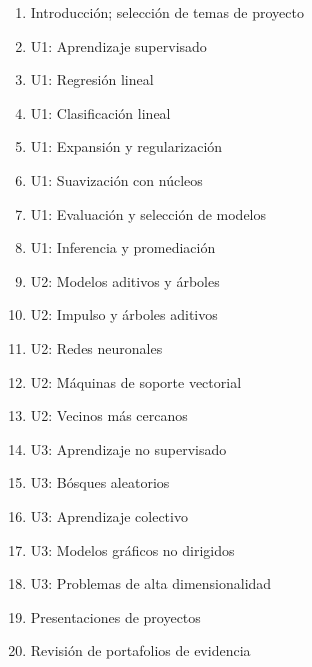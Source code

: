 \begin{enumerate}[itemsep=-3pt]
\item{Introducci\'{o}n; selecci\'{o}n de temas de proyecto}
\item{U1: Aprendizaje supervisado}
\item{U1: Regresi\'{o}n lineal}
\item{U1: Clasificaci\'{o}n lineal}
\item{U1: Expansi\'{o}n y regularizaci\'{o}n}
\item{U1: Suavizaci\'{o}n con n\'{u}cleos}
\item{U1: Evaluaci\'{o}n y selecci\'{o}n de modelos}
\item{U1: Inferencia y promediaci\'{o}n}
\item{U2: Modelos aditivos y \'{a}rboles}
\item{U2: Impulso y \'{a}rboles aditivos}
\item{U2: Redes neuronales}
\item{U2: M\'{a}quinas de soporte vectorial}
\item{U2: Vecinos m\'{a}s cercanos}
\item{U3: Aprendizaje no supervisado}
\item{U3: B\'{o}sques aleatorios}
\item{U3: Aprendizaje colectivo}
\item{U3: Modelos gr\'{a}ficos no dirigidos}
\item{U3: Problemas de alta dimensionalidad}
\item{Presentaciones de proyectos}
\item{Revisi\'{o}n de portafolios de evidencia}
\end{enumerate}
